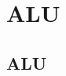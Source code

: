 \documentclass[11pt]{article}
\begin{document}


\section{ALU}
\label{sec:alu}


\subsection*{ALU}
\end{document}
